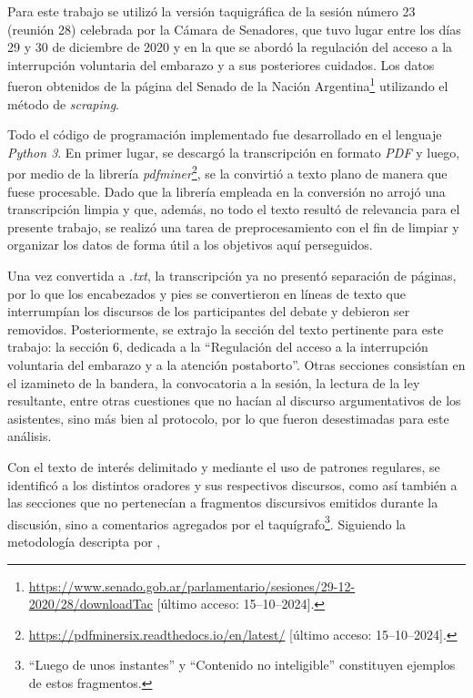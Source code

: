 Para este trabajo se utiliz\'o la versi\'on {taquigr\'afica} de la sesi\'on n\'umero
23 (reuni\'on 28) celebrada por la {C\'amara} de Senadores, que tuvo lugar entre los d\'ias
29 y 30 de diciembre de 2020 y en la que se abord\'o la
regulaci\'on del acceso a la interrupci\'on voluntaria del embarazo y a sus
posteriores cuidados. Los datos fueron obtenidos de la {p\'agina} del Senado de la Naci\'on
Argentina\footnote{\url{https://www.senado.gob.ar/parlamentario/sesiones/29-12-2020/28/downloadTac}
[\'ultimo acceso: 15--10--2024].}
utilizando el m\'etodo de \textit{scraping}.\par
Todo el c\'odigo de programaci\'on implementado fue desarrollado en el lenguaje
\textit{Python 3}. En primer lugar, se descarg\'o la transcripci\'on en formato \textit{PDF} y luego, por
medio de la librer\'ia \textit{pdfminer}\footnote{\url{https://pdfminersix.readthedocs.io/en/latest/}
[\'ultimo acceso: 15--10--2024].},
se la convirti\'o a texto plano de manera que fuese procesable. Dado que la librer\'ia
empleada en la conversi\'on no arroj\'o una transcripci\'on limpia y que, {adem\'as}, no todo el texto
result\'o de relevancia para el presente trabajo, se {realiz\'o} una tarea de
preprocesamiento con el fin de limpiar y organizar los datos de forma \'util a los
objetivos aqu\'i perseguidos.\par
Una vez convertida a \textit{.txt}, la transcripci\'on ya no present\'o separaci\'on de
{p\'aginas}, por lo que los encabezados y pies se convertieron en l\'ineas de texto que
interrump\'ian los discursos de los participantes del debate y debieron
ser removidos.
Posteriormente, se extrajo la secci\'on del texto pertinente para este trabajo:
la secci\'on 6, dedicada a la ``Regulaci\'on  del  acceso  a  la  interrupci\'on
voluntaria  del  embarazo  y  a  la atenci\'on postaborto''. Otras secciones consist\'ian
en el izamineto de la bandera, la convocatoria a la sesi\'on, la lectura de la ley
resultante, entre otras cuestiones que no hac\'ian al discurso argumentativos de los
asistentes, sino {m\'as} bien al protocolo, por lo que fueron desestimadas
para este {an\'alisis}.\par
Con el texto de inter\'es delimitado y mediante el uso de patrones regulares, se
identific\'o a los distintos oradores y sus respectivos discursos, como as\'i tambi\'en
a las secciones que no pertenec\'ian a fragmentos discursivos emitidos durante la
discusi\'on, sino a comentarios agregados por el taqu\'igrafo\footnote{``Luego de unos
instantes'' y ``Contenido no inteligible'' constituyen ejemplos de estos
fragmentos.}. Siguiendo la metodolog\'ia descripta por \cite{monroe2008fightin},

